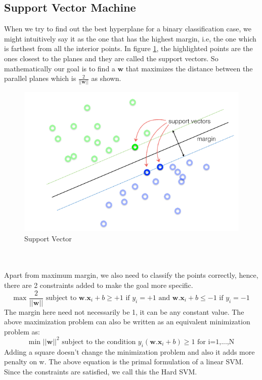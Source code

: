 \documentclass[11pt]{article}
\begin{document}
\subsection{Support Vector Machine}
When we try to find out the best hyperplane for a binary classification case, we might intuitively say it as the one that has the highest margin, i.e, the one which is farthest from all the interior points. In figure \ref{fig:SV1}, the highlighted points are the ones closest to the planes and they are called the support vectors. So mathematically our goal is to find a $\mathbf{w}$ that maximizes the distance between the parallel planes which is $\frac{2}{||\mathbf{w}||}$ as shown. 
\begin{figure}[h!]
    \centering
  \includegraphics[scale=0.7]{fig41.PNG}
  \caption{Support Vector}
  \label{fig:SV1}
\end{figure}
\\
\\Apart from maximum margin, we also need to classify the points correctly, hence, there are 2 constraints added to make the goal more specific.
\[\text{max }\frac{2}{||\mathbf{w}||} \text{ subject to } \mathbf{w}.\mathbf{x}_i+b\geq +1 \text{ if } y_i=+1 \text{ and } \mathbf{w}.\mathbf{x}_i+b\leq -1 \text{ if } y_i=-1\]
The margin here need not necessarily be 1, it can be any constant value. The above maximization problem can also be written as an equivalent minimization problem as:\[
\text{min }||\mathbf{w}||^2 \text{ subject to the condition } y_i(\mathbf{w}.\mathbf{x}_{i}+b)\geq1 \text{ for i=1,...,N}\]
Adding a square doesn't change the minimization problem and also it adds more penalty on w. The above equation is the primal formulation of a linear SVM. Since the constraints are satisfied, we call this the Hard SVM.
\end{document}
